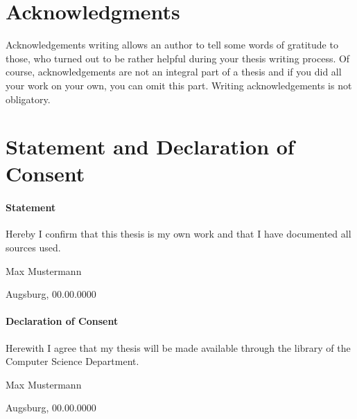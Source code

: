 \documentclass[12pt, a4paper, fleqn]{memoir}%
\begin{document}

\chapter*{Acknowledgments}
Acknowledgements writing allows an author to tell some words of gratitude to those, who turned out to be rather helpful during your thesis writing process. Of course, acknowledgements are not an integral part of a thesis and if you did all your work on your own, you can omit this part. Writing acknowledgements is not obligatory.

\chapter*{Statement and Declaration of Consent}
\vfill
\subsubsection*{\LARGE Statement}
Hereby I confirm that this thesis is my own work and that I have documented all sources used.
\vfill
\begin{flushleft}
Max Mustermann
\end{flushleft}  
\begin{flushright}
Augsburg, 00.00.0000 
\end{flushright}
\vfill
\vfill
\subsubsection*{\LARGE Declaration of Consent}
Herewith I agree that my thesis will be made available through the library of the Computer Science Department.
\vfill
\begin{flushleft}
Max Mustermann
\end{flushleft}  
\begin{flushright}
Augsburg, 00.00.0000 
\end{flushright}
\vfill

\cleardoublepage
\rmfamily
\normalfont
{}
\pagestyle{headings}
\tableofcontents
\end{document}
